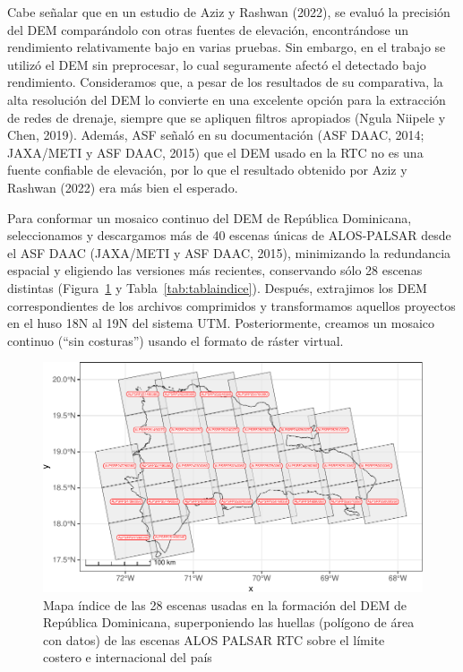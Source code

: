 \documentclass[spanish]{article}
\begin{document}
Cabe señalar que en un estudio de Aziz y Rashwan (2022), se evaluó la
precisión del DEM comparándolo con otras fuentes de elevación,
encontrándose un rendimiento relativamente bajo en varias pruebas. Sin
embargo, en el trabajo se utilizó el DEM sin preprocesar, lo cual
seguramente afectó el detectado bajo rendimiento. Consideramos que, a
pesar de los resultados de su comparativa, la alta resolución del DEM lo
convierte en una excelente opción para la extracción de redes de
drenaje, siempre que se apliquen filtros apropiados (Ngula Niipele y
Chen, 2019). Además, ASF señaló en su documentación (ASF DAAC, 2014;
JAXA/METI y ASF DAAC, 2015) que el DEM usado en la RTC no es una fuente
confiable de elevación, por lo que el resultado obtenido por Aziz y
Rashwan (2022) era más bien el esperado.

Para conformar un mosaico continuo del DEM de República Dominicana,
seleccionamos y descargamos más de 40 escenas únicas de ALOS-PALSAR
desde el ASF DAAC (JAXA/METI y ASF DAAC, 2015), minimizando la
redundancia espacial y eligiendo las versiones más recientes,
conservando sólo 28 escenas distintas (Figura~\ref{fig:mapaindice} y
Tabla~\ref{tab:tablaindice}). Después, extrajimos los DEM
correspondientes de los archivos comprimidos y transformamos aquellos
proyectos en el huso 18N al 19N del sistema UTM. Posteriormente, creamos
un mosaico continuo (``sin costuras'') usando el formato de ráster
virtual.

\begin{figure}

{\centering \includegraphics[width=0.8\linewidth]{preprint_files/figure-latex/mapaindice-1} 

}

\caption{Mapa índice de las 28 escenas usadas en la formación del DEM de República Dominicana, superponiendo las huellas (polígono de área con datos) de las escenas ALOS PALSAR RTC sobre el límite costero e internacional del país}\label{fig:mapaindice}
\end{figure}
\end{document}
